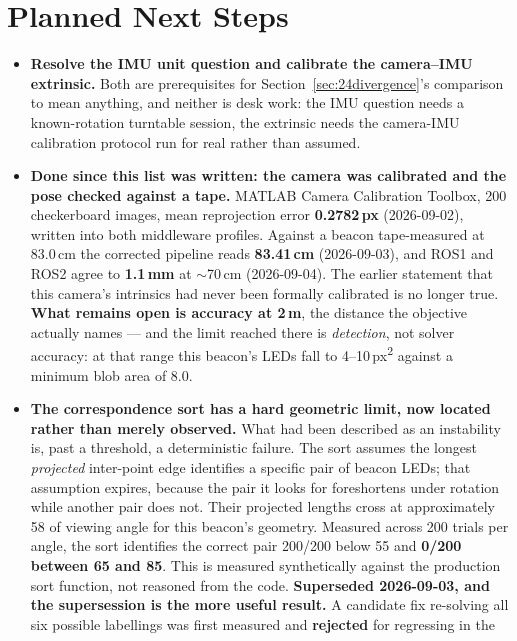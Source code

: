 \documentclass[11pt]{article}
\begin{document}
\section{Planned Next Steps}

\begin{itemize}
  \item \textbf{Resolve the IMU unit question and calibrate the camera--IMU
  extrinsic.} Both are prerequisites for Section~\ref{sec:24divergence}'s
  comparison to mean anything, and neither is desk work: the IMU question
  needs a known-rotation turntable session, the extrinsic needs the
  camera-IMU calibration protocol run for real rather than assumed.
  \item \textbf{Done since this list was written: the camera was calibrated
  and the pose checked against a tape.} MATLAB Camera Calibration Toolbox,
  200 checkerboard images, mean reprojection error \textbf{0.2782\,px}
  (2026-09-02), written into both middleware profiles. Against a beacon
  tape-measured at 83.0\,cm the corrected pipeline reads \textbf{83.41\,cm}
  (2026-09-03), and ROS1 and ROS2 agree to \textbf{1.1\,mm} at
  $\sim$70\,cm (2026-09-04). The earlier statement that this camera's
  intrinsics had never been formally calibrated is no longer true.
  \textbf{What remains open is accuracy at 2\,m}, the distance the
  objective actually names --- and the limit reached there is
  \emph{detection}, not solver accuracy: at that range this beacon's LEDs
  fall to 4--10\,px\textsuperscript{2} against a minimum blob area of 8.0.
  \item \textbf{The correspondence sort has a hard geometric limit, now
  located rather than merely observed.} What had been described as an
  instability is, past a threshold, a deterministic failure. The sort
  assumes the longest \emph{projected} inter-point edge identifies a
  specific pair of beacon LEDs; that assumption expires, because the pair it
  looks for foreshortens under rotation while another pair does not. Their
  projected lengths cross at approximately 58\textdegree{} of viewing angle
  for this beacon's geometry. Measured across 200 trials per angle, the sort
  identifies the correct pair 200/200 below 55\textdegree{} and
  \textbf{0/200 between 65\textdegree{} and 85\textdegree}. This is measured
  synthetically against the production sort function, not reasoned from the
  code. \textbf{Superseded 2026-09-03, and the supersession is
  the more useful result.} A candidate fix re-solving all six possible
  labellings was first measured and \textbf{rejected} for regressing in the

\end{itemize}
\end{document}
